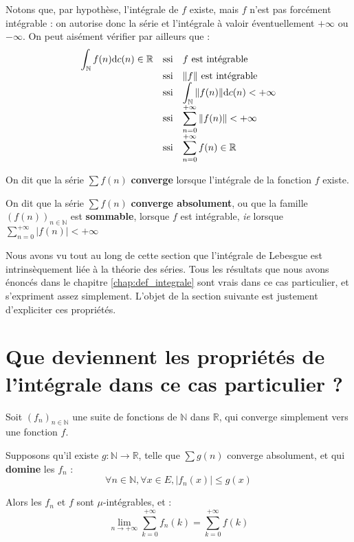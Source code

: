 \documentclass[../integ-proba.tex]{subfiles}
\begin{document}
    \begin{rem}
        Notons que, par hypothèse, l'intégrale de $f$ existe, mais $f$ n'est pas forcément intégrable : on autorise donc la série et l'intégrale à valoir éventuellement $+\infty$ ou $-\infty$.
        On peut aisément vérifier par ailleurs que :
        $$
        {
        \everymath={\displaystyle}
        \begin{array}{rcl}
            \int_\mathbb{N} f(n) \text{d} c(n) \in \mathbb{R} & \text{ssi} & f \text{ est intégrable } \\
                                                              & \text{ssi} & \|f\| \text{ est intégrable} \\
                                                              & \text{ssi} & \int_\mathbb{N} \|f(n)\| \text{d} c(n) < + \infty \\
                                                              & \text{ssi} & \sum_{n=0}^{+ \infty} \|f(n)\| < + \infty \\
                                                              & \text{ssi} & \sum_{n=0}^{+ \infty} f(n) \in \mathbb{R}
        \end{array}
        }
        $$
    \end{rem}

    \begin{defi}
        On dit que la série $\sum f(n)$ \textbf{converge} lorsque l'intégrale de la fonction $f$ existe.

        On dit que la série $\sum f(n)$ \textbf{converge absolument}, ou que la famille $\left(f(n)\right)_{n \in \mathbb{N}}$ est \textbf{sommable}, lorsque $f$ est intégrable, \textit{ie} lorsque $\sum_{n=0}^{+ \infty} \left|f(n)\right| < + \infty$
    \end{defi}

    Nous avons vu tout au long de cette section que l'intégrale de Lebesgue est intrinsèquement liée à la théorie des séries.
    Tous les résultats que nous avons énoncés dans le chapitre \ref{chap:def_integrale} sont vrais dans ce cas particulier, et s'expriment assez simplement.
    L'objet de la section suivante est justement d'expliciter ces propriétés.

    \section{Que deviennent les propriétés de l'intégrale dans ce cas particulier ?}

    \begin{thm}
      Soit $\left(f_n\right)_{n \in \mathbb{N}}$ une suite de fonctions de $\mathbb{N}$ dans $\mathbb{R}$, qui converge simplement vers une fonction $f$.

      Supposons qu'il existe $g:\mathbb{N} \longrightarrow \mathbb{R}$, telle que $\sum g(n)$ converge absolument, et qui \textbf{domine} les $f_n$ :
      $$
      \forall n \in \mathbb{N}, \forall x \in E, \left|f_n(x)\right| \leq g(x)
      $$

      Alors les $f_n$ et $f$ sont $\mu$-intégrables, et :
      $$
      \lim_{n \to + \infty} \sum_{k=0}^{+\infty} f_n(k) = \sum_{k=0}^{+\infty} f(k)
      $$
    \end{thm}
\end{document}
